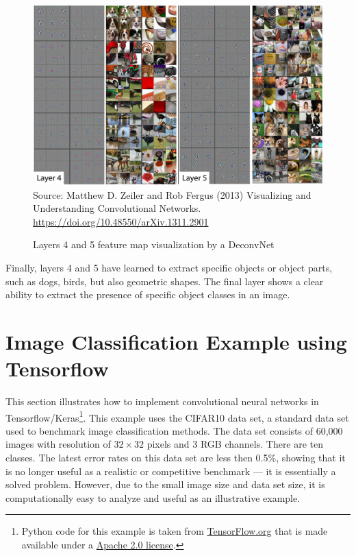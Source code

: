 \begin{figure}
\centering
\includegraphics[width=\textwidth]{layers45.png} \\
\vspace{0.5\baselineskip}
\scriptsize Source: Matthew D. Zeiler and Rob Fergus (2013) Visualizing and Understanding Convolutional Networks. \url{https://doi.org/10.48550/arXiv.1311.2901}
\caption{Layers 4 and 5 feature map visualization by a DeconvNet}
\label{fig:layer45}
\end{figure}

Finally, layers 4 and 5 have learned to extract specific objects or object parts, such as dogs, birds, but also geometric shapes. The final layer shows a clear ability to extract the presence of specific object classes in an image. 

\FloatBarrier

\section{Image Classification Example using Tensorflow}

This section illustrates how to implement convolutional neural networks in Tensorflow/Keras\footnote{Python code for this example is taken from \href{https://www.tensorflow.org/tutorials/images/cnn}{TensorFlow.org} that is made available under a \href{https://www.apache.org/licenses/LICENSE-2.0}{Apache 2.0 license}.}. This example uses the CIFAR10 data set, a standard data set used to benchmark image classification methods. The data set consists of 60,000 images with resolution of $32 \times 32$ pixels and 3 RGB channels. There are ten classes. The latest error rates on this data set are less then 0.5\%, showing that it is no longer useful as a realistic or competitive benchmark --- it is essentially a solved problem. However, due to the small image size and data set size, it is computationally easy to analyze and useful as an illustrative example. 

